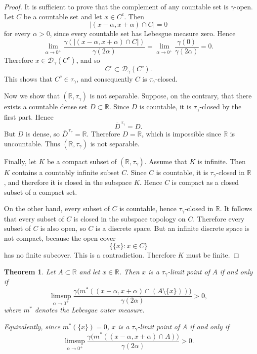 \documentclass{amsart}
\newtheorem{theorem}{Theorem}
\theoremstyle{plain}
\numberwithin{equation}{section}
\begin{document}
\begin{proof}
It is sufficient to prove that the complement of any countable set is $\gamma$-open. Let $C$ be a countable set and let $x \in C^c$. Then
$$
|(x-\alpha,x+\alpha)\cap C|=0
$$
for every $\alpha>0$, since every countable set has Lebesgue measure zero. Hence
$$
\lim_{\alpha\to 0^+}\frac{\gamma(|(x-\alpha,x+\alpha)\cap C|)}{\gamma(2\alpha)}
=
\lim_{\alpha\to 0^+}\frac{\gamma(0)}{\gamma(2\alpha)}
=0.
$$
Therefore $x\in \mathcal{D}_\gamma(C^c)$, and so
$$
C^c \subset \mathcal{D}_\gamma(C^c).
$$
This shows that $C^c\in\tau_\gamma$, and consequently $C$ is $\tau_\gamma$-closed.

Now we show that $(\mathbb{R},\tau_\gamma)$ is not separable. Suppose, on the contrary, that there exists a countable dense set $D \subset \mathbb{R}$. Since $D$ is countable, it is $\tau_\gamma$-closed by the first part. Hence
$$
\overline{D}^{\,\tau_\gamma}=D.
$$
But $D$ is dense, so $\overline{D}^{\,\tau_\gamma}=\mathbb{R}$. Therefore $D=\mathbb{R}$, which is impossible since $\mathbb{R}$ is uncountable. Thus $(\mathbb{R},\tau_\gamma)$ is not separable.

Finally, let $K$ be a compact subset of $(\mathbb{R},\tau_\gamma)$. Assume that $K$ is infinite. Then $K$ contains a countably infinite subset $C$. Since $C$ is countable, it is $\tau_\gamma$-closed in $\mathbb{R}$, and therefore it is closed in the subspace $K$. Hence $C$ is compact as a closed subset of a compact set.

On the other hand, every subset of $C$ is countable, hence $\tau_\gamma$-closed in $\mathbb{R}$. It follows that every subset of $C$ is closed in the subspace topology on $C$. Therefore every subset of $C$ is also open, so $C$ is a discrete space. But an infinite discrete space is not compact, because the open cover
$$
\big\{\{x\}:x\in C\big\}
$$
has no finite subcover. This is a contradiction. Therefore $K$ must be finite.
\end{proof}

\begin{theorem}
Let $A \subset \mathbb{R}$ and let $x \in \mathbb{R}$. Then $x$ is a $\tau_{\gamma}$-limit point of $A$ if and only if
$$
\limsup_{\alpha \to 0^+}
\frac{\gamma\bigl(m^*((x-\alpha,x+\alpha)\cap (A\setminus\{x\}))\bigr)}{\gamma(2\alpha)}
>0,
$$
where $m^*$ denotes the Lebesgue outer measure.

Equivalently, since $m^*(\{x\})=0$, $x$ is a $\tau_{\gamma}$-limit point of $A$ if and only if
$$
\limsup_{\alpha \to 0^+}
\frac{\gamma\bigl(m^*((x-\alpha,x+\alpha)\cap A)\bigr)}{\gamma(2\alpha)}
>0.
$$
\end{theorem}
\end{document}
